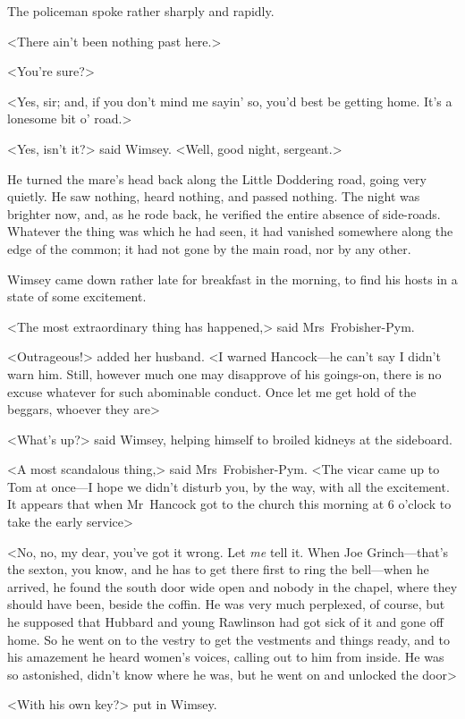 The policeman spoke rather sharply and rapidly.

<There ain't been nothing past here.>

<You're sure?>

<Yes, sir; and, if you don't mind me sayin' so, you'd best be getting home. It's a lonesome bit o' road.>

<Yes, isn't it?> said Wimsey. <Well, good night, sergeant.>

He turned the mare's head back along the Little Doddering road, going very quietly. He saw nothing, heard nothing, and passed nothing. The night was brighter now, and, as he rode back, he verified the entire absence of side-roads. Whatever the thing was which he had seen, it had vanished somewhere along the edge of the common; it had not gone by the main road, nor by any other.

\divider
Wimsey came down rather late for breakfast in the morning, to find his hosts in a state of some excitement.

<The most extraordinary thing has happened,> said Mrs~Frobisher-Pym.

<Outrageous!> added her husband. <I warned Hancock—he can't say I didn't warn him. Still, however much one may disapprove of his goings-on, there is no excuse whatever for such abominable conduct. Once let me get hold of the beggars, whoever they are\longdash>

<What's up?> said Wimsey, helping himself to broiled kidneys at the sideboard.

<A most scandalous thing,> said Mrs~Frobisher-Pym. <The vicar came up to Tom at once—I hope we didn't disturb you, by the way, with all the excitement. It appears that when Mr~Hancock got to the church this morning at 6 o'clock to take the early service\longdash>

<No, no, my dear, you've got it wrong. Let \textit{me} tell it. When Joe Grinch—that's the sexton, you know, and he has to get there first to ring the bell—when he arrived, he found the south door wide open and nobody in the chapel, where they should have been, beside the coffin. He was very much perplexed, of course, but he supposed that Hubbard and young Rawlinson had got sick of it and gone off home. So he went on to the vestry to get the vestments and things ready, and to his amazement he heard women's voices, calling out to him from inside. He was so astonished, didn't know where he was, but he went on and unlocked the door\longdash>

<With his own key?> put in Wimsey.

